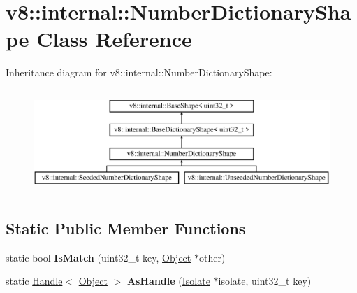\hypertarget{classv8_1_1internal_1_1_number_dictionary_shape}{}\section{v8\+:\+:internal\+:\+:Number\+Dictionary\+Shape Class Reference}
\label{classv8_1_1internal_1_1_number_dictionary_shape}
Inheritance diagram for v8\+:\+:internal\+:\+:Number\+Dictionary\+Shape\+:\begin{figure}[H]
\begin{center}
\leavevmode
\includegraphics[height=3.971631cm]{classv8_1_1internal_1_1_number_dictionary_shape}
\end{center}
\end{figure}
\subsection*{Static Public Member Functions}
\begin{DoxyCompactItemize}
\item 
static bool {\bfseries Is\+Match} (uint32\+\_\+t key, \hyperlink{classv8_1_1internal_1_1_object}{Object} $\ast$other)\hypertarget{classv8_1_1internal_1_1_number_dictionary_shape_a7110bfdac2c92ff9645904abb455c88e}{}\label{classv8_1_1internal_1_1_number_dictionary_shape_a7110bfdac2c92ff9645904abb455c88e}

\item 
static \hyperlink{classv8_1_1internal_1_1_handle}{Handle}$<$ \hyperlink{classv8_1_1internal_1_1_object}{Object} $>$ {\bfseries As\+Handle} (\hyperlink{classv8_1_1internal_1_1_isolate}{Isolate} $\ast$isolate, uint32\+\_\+t key)\hypertarget{classv8_1_1internal_1_1_number_dictionary_shape_a97e4b380de528fd2c60023fb7fbdcb6a}{}\label{classv8_1_1internal_1_1_number_dictionary_shape_a97e4b380de528fd2c60023fb7fbdcb6a}

\end{DoxyCompactItemize}
